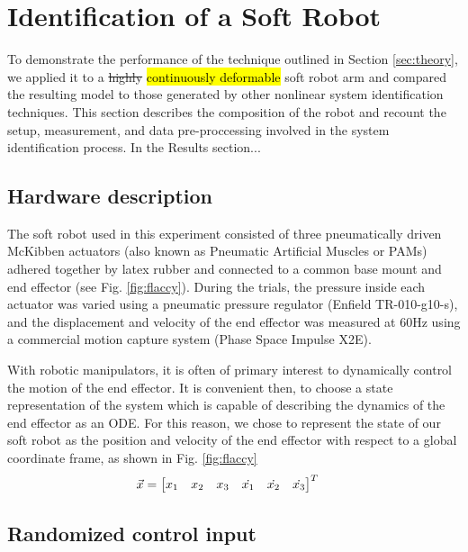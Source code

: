 \section{Identification of a Soft Robot}
\label{sec:experiment}

To demonstrate the performance of the technique outlined in Section \ref{sec:theory}, we applied it to a \sout{highly}  \hl{continuously deformable} soft robot arm and compared the resulting model to those generated by other nonlinear system identification techniques.
This section describes the composition of the robot and recount the setup, measurement, and data pre-proccessing involved in the system identification process.
In the Results section...

\subsection{Hardware description}

The soft robot used in this experiment consisted of three pneumatically driven McKibben actuators (also known as Pneumatic Artificial Muscles or PAMs) adhered together by latex rubber and connected to a common base mount and end effector (see Fig. \ref{fig:flaccy}).
During the trials, the pressure inside each actuator was varied using a pneumatic pressure regulator (Enfield TR-010-g10-s), and the displacement and velocity of the end effector was measured at $60 \text{Hz}$ using a commercial motion capture system (Phase Space Impulse X2E).

With robotic manipulators, it is often of primary interest to dynamically control the motion of the end effector.
It is convenient then, to choose a state representation of the system which is capable of describing the dynamics of the end effector as an ODE.
For this reason, we chose to represent the state of our soft robot as the position and velocity of the end effector with respect to a global coordinate frame, as shown in Fig. \ref{fig:flaccy}
\begin{align}
    \vec{x} &= \begin{bmatrix}  x_1 & x_2 & x_3 & \dot{x_1} & \dot{x_2} & \dot{x_3}  \end{bmatrix}^T
    \label{eq:state}
\end{align}

\subsection{Randomized control input}

